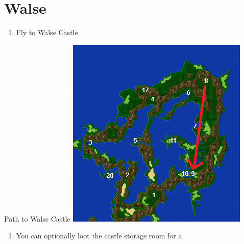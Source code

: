\chapter{Walse}

\vspace{\baselineskip}

\begin{paracol}{2}

\begin{enumerate}
    \item Fly to Walse Castle
\end{enumerate}

\switchcolumn
\begin{misc}{Path to Walse Castle}
    \includegraphics[scale=0.6]{../Graphics/Maps/1. To Walse.png}
\end{misc}

\switchcolumn*
\begin{enumerate}[resume]
    \item You can optionally loot the castle storage room for a 
\end{enumerate}


\end{paracol}
